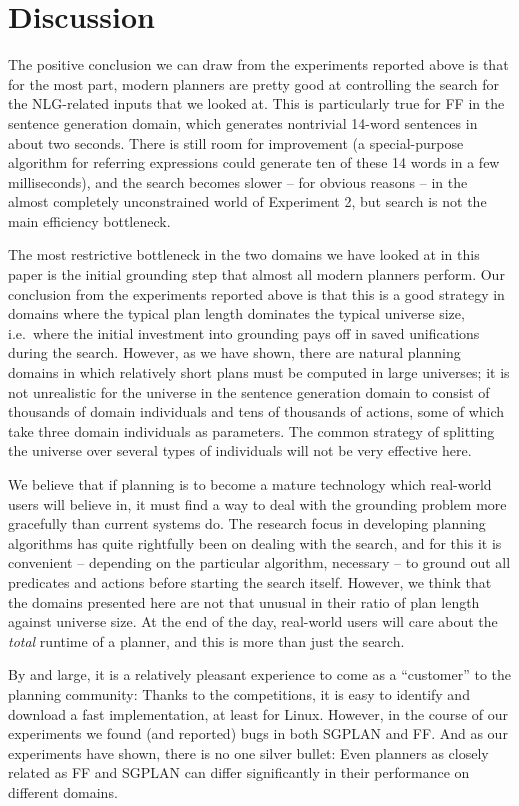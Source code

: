 \section{Discussion} \label{sec:discussion}

The positive conclusion we can draw from the experiments reported
above is that for the most part, modern planners are pretty good at
controlling the search for the NLG-related inputs that we looked at.
This is particularly true for FF in the sentence generation domain,
which generates nontrivial 14-word sentences in about two seconds.
There is still room for improvement (a special-purpose algorithm for
referring expressions could generate ten of these 14 words in a few
milliseconds), and the search becomes slower -- for obvious reasons --
in the almost completely unconstrained world of Experiment 2, but
search is not the main efficiency bottleneck.

The most restrictive bottleneck in the two domains we have looked at
in this paper is the initial grounding step that almost all modern
planners perform.  Our conclusion from the experiments reported above
is that this is a good strategy in domains where the typical plan
length dominates the typical universe size, i.e.\ where the initial
investment into grounding pays off in saved unifications during the
search.  However, as we have shown, there are natural planning domains
in which relatively short plans must be computed in large universes;
it is not unrealistic for the universe in the sentence generation
domain to consist of thousands of domain individuals and tens of
thousands of actions, some of which take three domain individuals as
parameters.  The common strategy of splitting the universe over
several types of individuals will not be very effective here.

We believe that if planning is to become a mature technology which
real-world users will believe in, it must find a way to deal with the
grounding problem more gracefully than current systems do.  The
research focus in developing planning algorithms has quite rightfully
been on dealing with the search, and for this it is convenient --
depending on the particular algorithm, necessary -- to ground out all
predicates and actions before starting the search itself.  However, we
think that the domains presented here are not that unusual in their
ratio of plan length against universe size.  At the end of the day,
real-world users will care about the \emph{total} runtime of a
planner, and this is more than just the search.

By and large, it is a relatively pleasant experience to come as a
``customer'' to the planning community: Thanks to the competitions, it
is easy to identify and download a fast implementation, at least for
Linux.  However, in the course of our experiments we found (and
reported) bugs in both SGPLAN and FF.  And as our experiments have
shown, there is no one silver bullet: Even planners as closely related
as FF and SGPLAN can differ significantly in their performance on
different domains.

